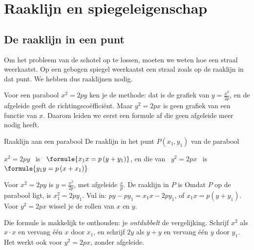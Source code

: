 
\section{Raaklijn en spiegeleigenschap}

\subsection{De raaklijn in een punt}

Om het probleem van de schotel op te lossen, moeten we weten hoe een straal weerkaatst. Op een gebogen spiegel weerkaatst een straal zoals op de raaklijn in dat punt. We hebben dus raaklijnen nodig.

Voor een parabool $x^2 = 2py$ ken je de methode: dat is de grafiek van $y = \tfrac{x^2}{2p}$, en de afgeleide geeft de richtingscoëfficiënt. Maar $y^2 = 2px$ is geen grafiek van een functie van $x$. Daarom leiden we eerst een formule af die geen afgeleide meer nodig heeft.

\begin{theorie}
\begin{stelling}{Raaklijn aan een parabool}
De raaklijn in het punt $P(x_1, y_1)$ van de parabool

\vspace{1mm}
\qquad $x^2 = 2py$ \ is \ $\formule{x_1 x = p\,(y + y_1)}$, \qquad en die van \ $y^2 = 2px$ \ is \ $\formule{y_1 y = p\,(x + x_1)}$
\end{stelling}

\begin{bewijs}
Voor $x^2 = 2py$ is $y = \tfrac{x^2}{2p}$, met afgeleide $\tfrac{x}{p}$. De raaklijn in $P$ is
Omdat $P$ op de parabool ligt, is $x_1^2 = 2py_1$. Vul in: $py - py_1 = x_1 x - 2py_1$, of $x_1 x = p(y + y_1)$. Voor $y^2 = 2px$ wissel je de rollen van $x$ en $y$.
\end{bewijs}
\end{theorie}

Die formule is makkelijk te onthouden: je \emph{ontdubbelt} de vergelijking. Schrijf $x^2$ als $x \cdot x$ en vervang één $x$ door $x_1$, en schrijf $2y$ als $y + y$ en vervang één $y$ door $y_1$. Het werkt ook voor $y^2 = 2px$, zonder afgeleide.

